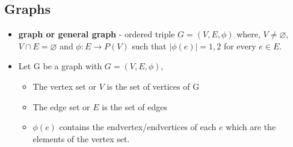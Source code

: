 \subsection{Graphs}
\begin{itemize}
 \item \textbf{graph or general graph} - ordered triple $G=(V,E,\phi)$ where, $V\neq\varnothing$, $V \cap E = \varnothing$ and $\phi:E \rightarrow P(V)$ such that $|\phi(e)|={1,2}$ for every $e \in E$.
 \item Let G be a graph with $G = (V,E,\phi)$,
	\begin{itemize}
		\item The vertex set or $V$ is the set of vertices of G
		\item The edge set or $E$ is the set of edges
		\item $\phi(e)$ contains the endvertex/endvertices of each $e$ which are the elements of the vertex set. 
	\end{itemize}	 
\begin{figure}[h!]
\centering
{}
\end{figure}
\end{itemize}
